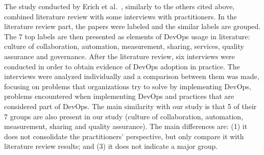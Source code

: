 The study conducted by Erich et al.~\cite{qualitative_devops_journalsw_17},
similarly to the others cited above, combined literature review with some
interviews with practitioners. In the literature review part, the papers were
labeled and the similar labels are grouped. The 7 top labels are then presented
as elements of DevOps usage in literature: culture of collaboration, automation,
measurement, sharing, services, quality assurance and governance. After the literature
review, six interviews were conducted in order to obtain evidence of DevOps
adoption in practice. The interviews were analyzed individually and a comparison
between them was made, focusing on problems that organizations try to solve by
implementing DevOps, problems encountered when implementing DevOps and practices
that are considered part of DevOps. The main similarity with our study
is that 5 of their 7 groups are also present in our study (culture of collaboration,
automation, measurement, sharing and quality assurance). The main
differences are: (1) it does not consolidate the practitioners' perspective, but
only compare it with literature review results; and (3) it does not indicate a major group.
